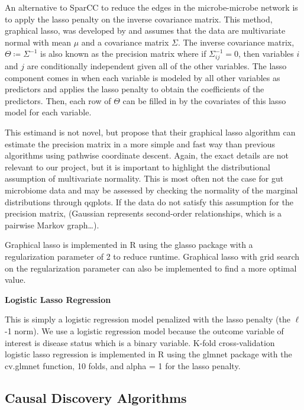 \documentclass[12pt,letterpaper]{article}
\begin{document}
An alternative to SparCC to reduce the edges in the microbe-microbe network is to apply the lasso penalty on the inverse covariance matrix. This method, graphical lasso, was developed by \citep{friedman2007glasso} and assumes that the data are multivariate normal with mean $\mu$ and a covariance matrix $\Sigma$. The inverse covariance matrix, $\Theta \coloneq \Sigma^{-1}$ is also known as the precision matrix where if $\Sigma_{ij}^{-1} = 0$, then variables $i$ and $j$ are conditionally independent given all of the other variables. The lasso component comes in when each variable is modeled by all other variables as predictors and applies the lasso penalty to obtain the coefficients of the predictors. Then, each row of $\Theta$ can be filled in by the covariates of this lasso model for each variable. 

This estimand is not novel, but \citep{friedman2007glasso} propose that their graphical lasso algorithm can estimate the precision matrix in a more simple and fast way than previous algorithms using pathwise coordinate descent. Again, the exact details are not relevant to our project, but it is important to highlight the distributional assumption of multivariate normality. This is most often not the case for gut microbiome data and may be assessed by checking the normality of the marginal distributions through qqplots. If the data do not satisfy this assumption for the precision matrix, (Gaussian represents second-order relationships, which is a pairwise Markov graph…).

Graphical lasso is implemented in R using the glasso package with a regularization parameter of 2 to reduce runtime. Graphical lasso with grid search on the regularization parameter can also be implemented to find a more optimal value. \newline

\textbf{Logistic Lasso Regression}

This is simply a logistic regression model penalized with the lasso penalty (the $\ell$-1 norm). We use a logistic regression model because the outcome variable of interest is disease status which is a binary variable. K-fold cross-validation logistic lasso regression is implemented in R using the glmnet package with the cv.glmnet function, 10 folds, and alpha = 1 for the lasso penalty.

\subsection{Causal Discovery Algorithms}
\end{document}
